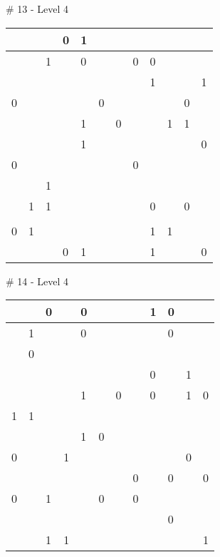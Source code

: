 \medskip

\# 13 - Level 4 \newline
\begin{tabular}{|m{\collen}|m{\collen}|m{\collen}|m{\collen}|m{\collen}|m{\collen}|m{\collen}|m{\collen}|m{\collen}|m{\collen}|m{\collen}|m{\collen}|}
\hline
    &   &   & 0 & 1 &   &   &   &   &   &   &   \\
\hline
    &   & 1 &   & 0 &   &   & 0 & 0 &   &   &   \\
\hline
    &   &   &   &   &   &   &   & 1 &   &   & 1 \\
\hline
  0 &   &   &   &   & 0 &   &   &   &   & 0 &   \\
\hline
    &   &   &   & 1 &   & 0 &   &   & 1 & 1 &   \\
\hline
    &   &   &   & 1 &   &   &   &   &   &   & 0 \\
\hline
  0 &   &   &   &   &   &   & 0 &   &   &   &   \\
\hline
    &   & 1 &   &   &   &   &   &   &   &   &   \\
\hline
    & 1 & 1 &   &   &   &   &   & 0 &   & 0 &   \\
\hline
    &   &   &   &   &   &   &   &   &   &   &   \\
\hline
  0 & 1 &   &   &   &   &   &   & 1 & 1 &   &   \\
\hline
    &   &   & 0 & 1 &   &   &   & 1 &   &   & 0 \\
\hline
\end{tabular}


\medskip

\# 14 - Level 4 \newline
\begin{tabular}{|m{\collen}|m{\collen}|m{\collen}|m{\collen}|m{\collen}|m{\collen}|m{\collen}|m{\collen}|m{\collen}|m{\collen}|m{\collen}|m{\collen}|}
\hline
    &   & 0 &   & 0 &   &   &   & 1 & 0 &   &   \\
\hline
    & 1 &   &   & 0 &   &   &   &   & 0 &   &   \\
\hline
    & 0 &   &   &   &   &   &   &   &   &   &   \\
\hline
    &   &   &   &   &   &   &   & 0 &   & 1 &   \\
\hline
    &   &   &   & 1 &   & 0 &   & 0 &   & 1 & 0 \\
\hline
  1 & 1 &   &   &   &   &   &   &   &   &   &   \\
\hline
    &   &   &   & 1 & 0 &   &   &   &   &   &   \\
\hline
  0 &   &   & 1 &   &   &   &   &   &   & 0 &   \\
\hline
    &   &   &   &   &   &   & 0 &   & 0 &   & 0 \\
\hline
  0 &   & 1 &   &   & 0 &   & 0 &   &   &   &   \\
\hline
    &   &   &   &   &   &   &   &   & 0 &   &   \\
\hline
    &   & 1 & 1 &   &   &   &   &   &   &   & 1 \\
\hline
\end{tabular}


